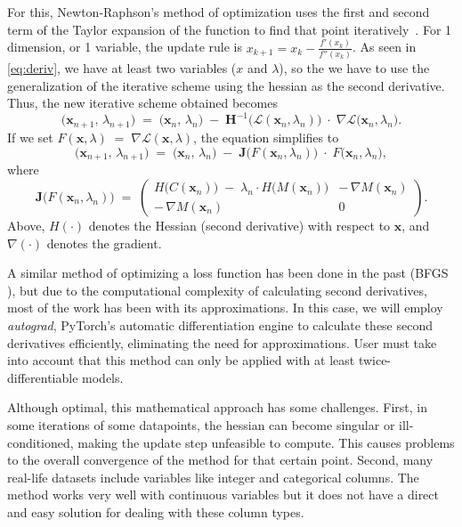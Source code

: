 \documentclass[12pt]{extarticle}
\numberwithin{equation}{section}
\begin{document}
For this, Newton-Raphson’s method of optimization uses the first and second term of the Taylor expansion of the function to find that point iteratively~\cite{fliege2009newton}. For 1 dimension, or 1 variable, the update rule is $x_{k+1}=x_{k}-{\frac {f'(x_{k})}{f''(x_{k})}}$. As seen in \eqref{eq:deriv}, we have at least two variables ($x$ and $\lambda$), so the we have to use the generalization of the iterative scheme using the hessian as the second derivative. Thus, the new iterative scheme obtained becomes
\begin{equation}\label{eq:newton}
\bigl(\mathbf{x}_{n+1},\,\lambda_{n+1}\bigr)
\;=\;
\bigl(\mathbf{x}_n,\,\lambda_n\bigr)
\;-\;
\mathbf{H}^{-1}\!\bigl(\mathcal{L}(\mathbf{x}_n,\lambda_n)\bigr)
\;\cdot\;
\nabla\mathcal{L}\bigl(\mathbf{x}_n,\lambda_n\bigr).
\end{equation}
If we set $F(\mathbf{x},\lambda) \;=\;\nabla \mathcal{L}(\mathbf{x},\lambda)$, 
the equation simplifies to
\[
\bigl(\mathbf{x}_{n+1},\,\lambda_{n+1}\bigr)
\;=\;
\bigl(\mathbf{x}_n,\,\lambda_n\bigr)
\;-\;
\mathbf{J}\!\bigl(F(\mathbf{x}_n,\lambda_n)\bigr)
\;\cdot\;
F\!\bigl(\mathbf{x}_n,\lambda_n\bigr),
\]
where
\begin{equation}\label{eq:hessian}
\mathbf{J}\!\bigl(F(\mathbf{x}_n,\lambda_n)\bigr)
\;=\;
\begin{pmatrix}
H\!\bigl(C(\mathbf{x}_n)\bigr)\;-\;\lambda_n \cdot H\!\bigl(M(\mathbf{x}_n)\bigr) 
    & -\,\nabla M(\mathbf{x}_n)
\\[6pt]
-\,\nabla M(\mathbf{x}_n)
    & 0
\end{pmatrix}.
\end{equation}
Above, $H(\cdot)$ denotes the Hessian (second derivative) with respect to $\mathbf{x}$, 
and $\nabla(\cdot)$ denotes the gradient.

A similar method of optimizing a loss function has been done in the past (BFGS \cite{papakonstantinou2009historical}), 
but due to the computational complexity of calculating second derivatives, most of the work has been with its approximations. In this case, we will employ \emph{autograd}, PyTorch's automatic differentiation engine to calculate these second derivatives efficiently, eliminating the need for approximations. User must take into account that this method can only be applied with at least twice-differentiable models.

Although optimal, this mathematical approach has some challenges. First, in some iterations of some datapoints, the hessian can become singular or ill-conditioned, making the update step unfeasible to compute. This causes problems to the overall convergence of the method for that certain point. 
Second, many real-life datasets include variables like integer and categorical columns. The method works very well with continuous variables but it does not have a direct and easy solution for dealing with these column types.
\end{document}
